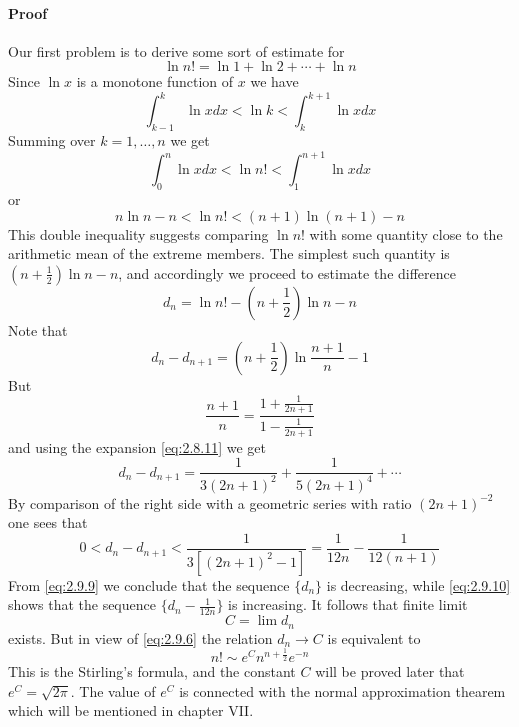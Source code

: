 \documentclass{article}
\numberwithin{equation}{subsection}
\begin{document}
			\paragraph{Proof} Our first problem is to derive some sort of estimate for
			\begin{equation}
				\ln n! = \ln 1+\ln 2 + \cdots + \ln n
			\end{equation}
			Since $\ln x$ is a monotone function of $x$ we have
			\begin{equation}
				\int_{k-1}^{k}\ln xdx < \ln k < \int_{k}^{k+1}\ln xdx
			\end{equation}
			Summing over $k=1,\dots,n$ we get
			\begin{equation}
				\int_{0}^{n}\ln xdx < \ln n! < \int_{1}^{n+1}\ln xdx
			\end{equation}
			or
			\begin{equation}
				n\ln n-n < \ln n! < (n+1)\ln(n+1)-n
			\end{equation}
			This double inequality suggests comparing $\ln n!$ with some quantity close to the arithmetic mean of the extreme members. The simplest such quantity is $(n+\frac{1}{2})\ln n - n$, and accordingly we proceed to estimate the difference
			\begin{equation}
				\label{eq:2.9.6}
				d_n=\ln n! - (n+\frac{1}{2})\ln n - n
			\end{equation}
			Note that
			\begin{equation}
				d_n-d_{n+1}=(n+\frac{1}{2})\ln \frac{n+1}{n}-1
			\end{equation}
			But
			\begin{equation}
				\frac{n+1}{n}=\frac{1+\frac{1}{2n+1}}{1-\frac{1}{2n+1}}
			\end{equation}
			and using the expansion \eqref{eq:2.8.11} we get
			\begin{equation}
				\label{eq:2.9.9}
				d_n-d_{n+1}=\frac{1}{3(2n+1)^2}+\frac{1}{5(2n+1)^4}+\cdots
			\end{equation}
			By comparison of the right side with a geometric series with ratio $(2n+1)^{-2}$ one sees that
			\begin{equation}
				\label{eq:2.9.10}
				0 < d_n-d_{n+1} < \frac{1}{3[(2n+1)^2-1]}=\frac{1}{12n}-\frac{1}{12(n+1)}
			\end{equation}
			From \eqref{eq:2.9.9} we conclude that the sequence $\{d_n\}$ is decreasing, while \eqref{eq:2.9.10} shows that the sequence $\{d_n-\frac{1}{12n}\}$ is increasing. It follows that finite limit
			\begin{equation}
				C = \lim d_n
			\end{equation}
			exists. But in view of \eqref{eq:2.9.6} the relation $d_n\rightarrow C$ is equivalent to
			\begin{equation}
				n! \sim e^Cn^{n+\frac{1}{2}}e^{-n}
			\end{equation}
			This is the Stirling's formula, and the constant $C$ will be proved later that $e^C = \sqrt{2\pi}$. The value of $e^C$ is connected with the normal approximation thearem which will be mentioned in chapter VII.
\end{document}
